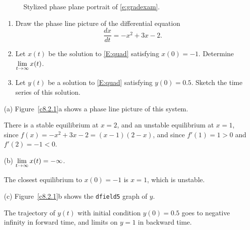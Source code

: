 \documentclass{ximera}
\begin{document}
\begin{figure}[htb]
           \centerline{%
           }
           \caption{Stylized phase plane portrait of \protect\eqref{e:gradexam}.}
           \label{F:gradexamstyle}
\end{figure}

\EXER

\TEXER

\begin{exercise} \label{c8.2.1}
\begin{enumerate}
\item[(a)] Draw the phase line picture of the differential
equation 
\begin{equation}  \label{E:quad}
\frac{dx}{dt} = -x^2 +3x -2.
\end{equation}
\item[(b)] Let $x(t)$ be the solution to \eqref{E:quad} satisfying
$x(0)=-1$.  Determine $\displaystyle\lim_{t\to\infty} x(t)$. 
\item[(c)] Let $y(t)$ be a solution to \eqref{E:quad} satisfying
$y(0)=0.5$. Sketch the time series of this solution.
\end{enumerate}

\begin{solution}

(a) \ans Figure~\ref{c8.2.1}a shows a phase line picture
of this system.

\soln There is a stable equilibrium at $x = 2$, and an unstable
equilibrium at $x = 1$, since $f(x) = -x^2 + 3x - 2 = (x - 1)(2 - x)$,
and since $f'(1) = 1 > 0$ and $f'(2) = -1 < 0$.

(b) \ans $\displaystyle\lim_{t \to \infty} x(t) = -\infty$.

\soln The closest equilibrium to $x(0) = -1$ is $x = 1$, which is
unstable. 

(c) \ans Figure~\ref{c8.2.1}b shows the {\tt dfield5} graph of $y$.

\soln The trajectory of $y(t)$ with initial condition $y(0) = 0.5$ goes
to negative infinity in forward time, and limits on $y = 1$ in
backward time.

\begin{figure}[htb]
                       \centerline{%
                       }
\end{figure}



\end{solution}
\end{exercise}
\end{document}
